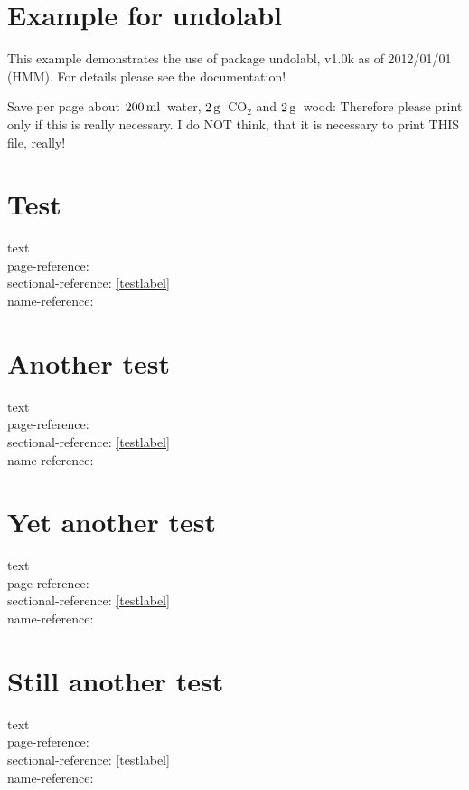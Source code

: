 \documentclass[british]{article}[2007/10/19]%
\gdef\unit#1{\mathord{\thinspace\mathrm{#1}}}%
\begin{document}
\section*{Example for undolabl}

This example demonstrates the use of package\newline
\textsf{undolabl}, v1.0k as of 2012/01/01 (HMM).\newline
For details please see the documentation!\newline

\noindent Save per page about $200\unit{ml}$~water,
$2\unit{g}$~CO$_{2}$ and $2\unit{g}$~wood:\newline
Therefore please print only if this is really necessary.\newline
I do NOT think, that it is necessary to print THIS file, really!

\bigskip

\section{Test}

text \label{testlabel}\\
page-reference: \pageref{testlabel}\\%
sectional-reference: \ref{testlabel}\\%
name-reference: %

\newpage

\section{Another test}

text \\
page-reference: \pageref{testlabel}\\%
sectional-reference: \ref{testlabel}\\%
name-reference: %

\newpage

\section{Yet another test}

text \\
page-reference: \pageref{testlabel}\\%
sectional-reference: \ref{testlabel}\\%
name-reference: %

\newpage

\section{Still another test}

text \\
page-reference: \pageref{testlabel}\\%
sectional-reference: \ref{testlabel}\\%
name-reference: %
\end{document}
